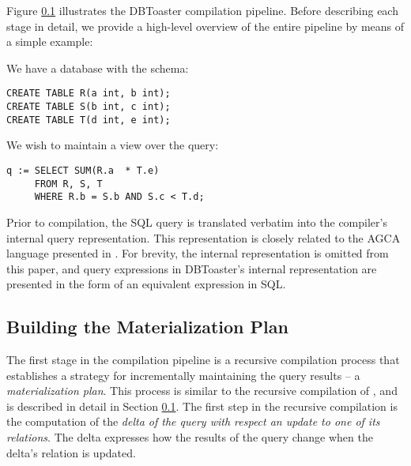 Figure \ref{} illustrates the DBToaster compilation pipeline.  Before describing each stage in detail, we provide a high-level overview of the entire pipeline by means of a simple example:

\begin{example}
\label{ex:compiler:rst}
We have a database with the schema: 
\begin{verbatim}
CREATE TABLE R(a int, b int); 
CREATE TABLE S(b int, c int);
CREATE TABLE T(d int, e int);
\end{verbatim}

We wish to maintain a view over the query:
\begin{verbatim}
q := SELECT SUM(R.a  * T.e)
     FROM R, S, T
     WHERE R.b = S.b AND S.c < T.d;
\end{verbatim}
\end{example}

Prior to compilation, the SQL query is translated verbatim into the compiler's internal query representation.  This representation is closely related to the AGCA language presented in \cite{dbtoaster-pods}.  For brevity, the internal representation is omitted from this paper, and query expressions in DBToaster's internal representation are presented in the form of an equivalent expression in SQL.  

\subsection{Building the Materialization Plan}
The first stage in the compilation pipeline is a recursive compilation process that establishes a strategy for incrementally maintaining the query results -- a {\em materialization plan}.  This process is similar to the recursive compilation of \cite{dbtoaster-cidr,dbtoaster-pods}, and is described in detail in Section \ref{}.  The first step in the recursive compilation is the computation of the {\em delta of the query with respect an update to one of its relations}.  The delta expresses how the results of the query change when the delta's relation is updated.  

